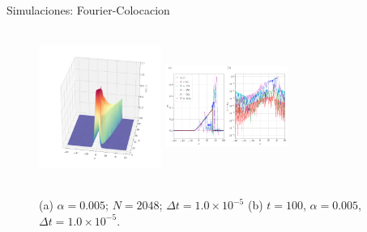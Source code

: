 \begin{frame}{Simulaciones: Fourier-Colocacion \hspace{2cm} \hyperlink{Navegador}{}}
		\begin{figure}
	    \centering
	    \includegraphics[height=5cm,width=4cm]{files/figures/viscid/collocation/Numerical_Solution_alpha=0005.png}
	    \qquad
	    \includegraphics[height=5cm,width=4cm]{files/figures/viscid/collocation/Numerical_Solution_alpha=0005_T=100.png}
    	\caption{(a) $\alpha = 0.005$; $N=2048$; $\Delta t = 1.0 \times 10^{-5}$ (b) $t = 100$, $\alpha = 0.005$, $\Delta t = 1.0 \times 10^{-5}$.}
	\end{figure}
\end{frame}

